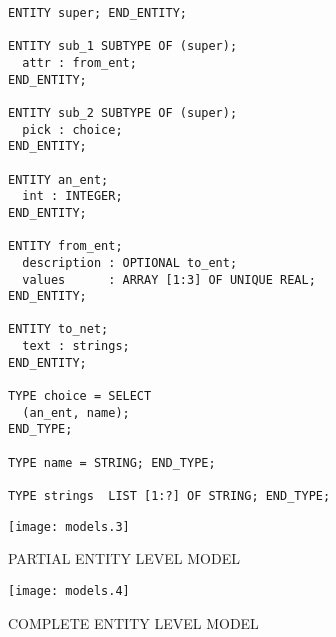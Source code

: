 \begin{remarks}
\remintro
{}

\begin{verbatim}
ENTITY super; END_ENTITY;

ENTITY sub_1 SUBTYPE OF (super);
  attr : from_ent;
END_ENTITY;

ENTITY sub_2 SUBTYPE OF (super);
  pick : choice;
END_ENTITY;

ENTITY an_ent;
  int : INTEGER;
END_ENTITY;

ENTITY from_ent;
  description : OPTIONAL to_ent;
  values      : ARRAY [1:3] OF UNIQUE REAL;
END_ENTITY;

ENTITY to_net;
  text : strings;
END_ENTITY;

TYPE choice = SELECT
  (an_ent, name);
END_TYPE;

TYPE name = STRING; END_TYPE;

TYPE strings  LIST [1:?] OF STRING; END_TYPE;
\end{verbatim}

\remend
\end{remarks}


\begingroup

\normalsize
\ifnotes
\fi

\centering
\texttt{[image: models.3]}

\vspace{\afttit}

PARTIAL ENTITY LEVEL MODEL

\vspace{\afttit}


\centering
\texttt{[image: models.4]}

\vspace{\afttit}

COMPLETE ENTITY LEVEL MODEL

\endgroup


